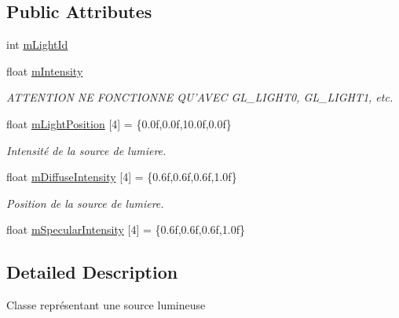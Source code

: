 \subsection*{Public Attributes}
\begin{DoxyCompactItemize}
\item 
int \hyperlink{struct_light_source_data_1_1_point_light_source_af1e590645aa46ca01388ee4204f17eb7}{m\+Light\+Id}
\item 
float \hyperlink{struct_light_source_data_1_1_point_light_source_af7c91e317104049245c90bc39cdc9d7c}{m\+Intensity}
\begin{DoxyCompactList}\small\item\em A\+T\+T\+E\+N\+T\+I\+O\+N N\+E F\+O\+N\+C\+T\+I\+O\+N\+N\+E Q\+U'A\+V\+E\+C G\+L\+\_\+\+L\+I\+G\+H\+T0, G\+L\+\_\+\+L\+I\+G\+H\+T1, etc. \end{DoxyCompactList}\item 
float \hyperlink{struct_light_source_data_1_1_point_light_source_a54b8bcb5e6c8779065b39137b54e7a4a}{m\+Light\+Position} \mbox{[}4\mbox{]} = \{0.\+0f,0.\+0f,10.\+0f,0.\+0f\}
\begin{DoxyCompactList}\small\item\em Intensité de la source de lumiere. \end{DoxyCompactList}\item 
float \hyperlink{struct_light_source_data_1_1_point_light_source_ad13d5b37ea396ed9b299943605f0bf42}{m\+Diffuse\+Intensity} \mbox{[}4\mbox{]} = \{0.\+6f,0.\+6f,0.\+6f,1.\+0f\}
\begin{DoxyCompactList}\small\item\em Position de la source de lumiere. \end{DoxyCompactList}\item 
float \hyperlink{struct_light_source_data_1_1_point_light_source_ad561b4571eac75209782dd6a5ac2cabd}{m\+Specular\+Intensity} \mbox{[}4\mbox{]} = \{0.\+6f,0.\+6f,0.\+6f,1.\+0f\}
\end{DoxyCompactItemize}


\subsection{Detailed Description}
Classe représentant une source lumineuse 

